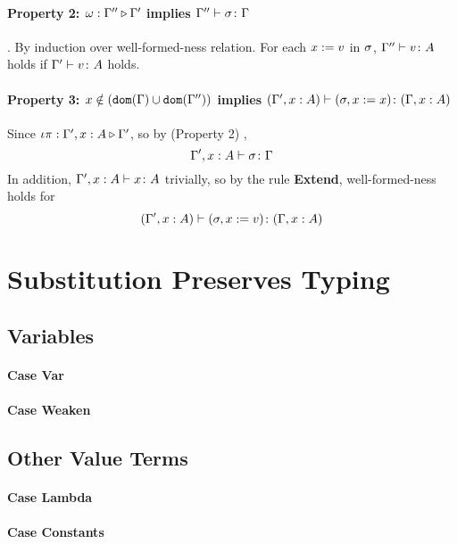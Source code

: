 \documentclass{report}
\begin{document}
    \paragraph{Property 2: $\omega : \Gamma'' \triangleright \Gamma'$ implies $\Gamma'' \vdash \sigma \colon \Gamma$}. 
    By induction over well-formed-ness relation. For each $x:= v$ in $\sigma$, $\Gamma'' \vdash v \colon A$ holds if $\Gamma' \vdash v \colon A$ holds.
    \paragraph{Property 3: $x \notin (\texttt{dom}(\Gamma) \cup \texttt{dom}(\Gamma''))$ implies $(\Gamma', x: A) \vdash (\sigma, x := x) \colon (\Gamma, x: A)$} 
    Since $\iota\pi : \Gamma',x: A \triangleright \Gamma'$, so by (Property 2) , 
    $$\Gamma', x: A \vdash \sigma \colon \Gamma$$
    In addition, $\Gamma', x: A \vdash x \colon A$ trivially, so by the rule \textbf{Extend}, well-formed-ness holds for
    \begin{equation}
        (\Gamma', x:A) \vdash (\sigma, x:= v) \colon (\Gamma, x: A)
    \end{equation}


\section{Substitution Preserves Typing}

\subsection{Variables}  
    \paragraph{Case Var}
       
        
    \paragraph{Case Weaken}
       
\subsection{Other Value Terms}
\paragraph{Case Lambda}
\paragraph{Case Constants}
    
\end{document}
